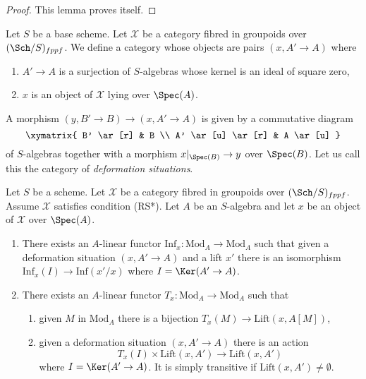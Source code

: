 \begin{proof}
This lemma proves itself.
\end{proof}

\noindent
Let $S$ be a base scheme. Let $\mathcal{X}$ be a category fibred
in groupoids over $(\Sch/S)_{fppf}$. We define a category whose objects are
pairs $(x, A' \to A)$ where
\begin{enumerate}
\item $A' \to A$ is a surjection of $S$-algebras whose kernel
is an ideal of square zero,
\item $x$ is an object of $\mathcal{X}$ lying over $\Spec(A)$.
\end{enumerate}
A morphism $(y, B' \to B) \to (x, A' \to A)$ is given by a commutative
diagram
$$
\xymatrix{
B' \ar[r] & B \\
A' \ar[u] \ar[r] & A \ar[u]
}
$$
of $S$-algebras together with a morphism $x|_{\Spec(B)} \to y$ over
$\Spec(B)$. Let us call this the category of {\it deformation situations}.

\begin{lemma}
\label{lemma-properties-lift-RS-star}
Let $S$ be a scheme. Let $\mathcal{X}$ be a category
fibred in groupoids over $(\Sch/S)_{fppf}$. Assume $\mathcal{X}$ satisfies
condition (RS*). Let $A$ be an $S$-algebra and let $x$ be an object of
$\mathcal{X}$ over $\Spec(A)$.
\begin{enumerate}
\item There exists an $A$-linear functor
$\text{Inf}_x : \text{Mod}_A \to \text{Mod}_A$
such that given a deformation situation $(x, A' \to A)$ and a lift $x'$
there is an isomorphism $\text{Inf}_x(I) \to \text{Inf}(x'/x)$ where
$I = \Ker(A' \to A)$.
\item There exists an $A$-linear functor
$T_x : \text{Mod}_A \to \text{Mod}_A$
such that
\begin{enumerate}
\item given $M$ in $\text{Mod}_A$ there is a bijection
$T_x(M) \to \text{Lift}(x, A[M])$,
\item given a deformation situation $(x, A' \to A)$ there is an action
$$
T_x(I) \times \text{Lift}(x, A') \to \text{Lift}(x, A')
$$
where $I = \Ker(A' \to A)$. It is simply transitive if
$\text{Lift}(x, A') \not = \emptyset$.
\end{enumerate}
\end{enumerate}
\end{lemma}

